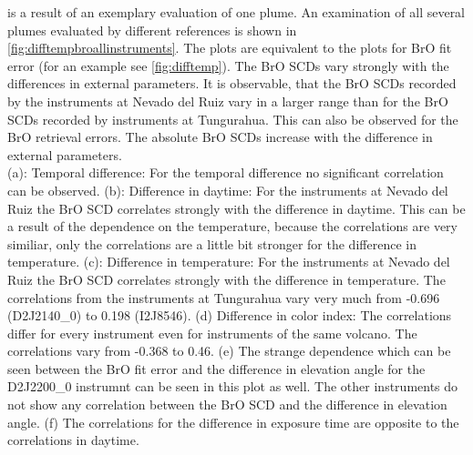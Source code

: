 \documentclass  [
  paper    = a4,
  BCOR     = 10mm,
  twoside,
  fontsize = 12pt,
  fleqn,
  toc      = bibnumbered,
  toc      = listofnumbered,
  numbers  = noendperiod,
  headings = normal,
  listof   = leveldown,
  version  = 3.03
]                                       {scrreprt}
\begin{document}
	 is a result of an exemplary evaluation of one plume. An examination of all several plumes evaluated by different references is shown in \cref{fig:difftempbroallinstruments}. The plots are equivalent to the plots for BrO fit error (for an example see \cref{fig:difftemp}). The BrO SCDs vary strongly with the differences in external parameters. It is observable, that the BrO SCDs recorded by the instruments at Nevado del Ruiz vary in a larger range than for the BrO SCDs recorded by instruments at Tungurahua. This can also be observed for the BrO retrieval errors. The absolute BrO SCDs increase with the difference in external parameters.\\
	  (a): Temporal difference: For the temporal difference no significant correlation can be observed.
	 (b): Difference in daytime: For the instruments at Nevado del Ruiz the BrO SCD correlates strongly with the difference in daytime. This can be a result of the dependence on the temperature, because the correlations are very similiar, only the correlations are a little bit stronger for the difference in temperature.
	 (c): Difference in temperature: For the instruments at Nevado del Ruiz the BrO SCD correlates strongly with the difference in temperature. The correlations from the instruments at Tungurahua vary very much from -0.696 (D2J2140\_0) to 0.198 (I2J8546).
	  (d) Difference in color index: The correlations differ for every instrument even for instruments of the same volcano. The correlations vary from -0.368 to 0.46.
	  (e) The strange dependence which can be seen between the BrO fit error and the difference in elevation angle for the D2J2200\_0 instrumnt can be seen in this plot as well. The other instruments do not show any correlation between the BrO SCD and the difference in elevation angle.
	  (f) The correlations for the difference in exposure time are opposite to the correlations in daytime. 
\end{document}
